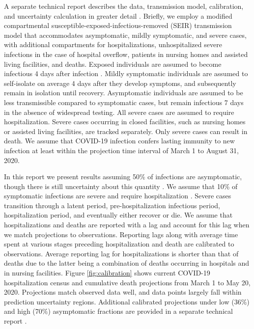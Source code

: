 \documentclass[11pt]{article}
\begin{document}
A separate technical report describes the data, transmission model, calibration, and uncertainty calculation in greater detail \citep{morozova2020tech}.  Briefly, we employ a modified compartmental susceptible-exposed-infectious-removed (SEIR) transmission model that accommodates asymptomatic, mildly symptomatic, and severe cases, with additional compartments for hospitalizations, unhospitalized severe infections in the case of hospital overflow, patients in nursing homes and assisted living facilities, and deaths. Exposed individuals are assumed to become infectious 4 days after infection \citep{lauer2020incubation, bi2020epidemiology, li2020early, linton2020incubation, he2020estimation, salje2020estimating, wei2020presymptomatic}.  Mildly symptomatic individuals are assumed to self-isolate on average 4 days after they develop symptoms, and subsequently remain in isolation until recovery. Asymptomatic individuals are assumed to be less transmissible compared to symptomatic cases, but remain infectious 7 days in the absence of widespread testing. All severe cases are assumed to require hospitalization. Severe cases occurring in closed facilities, such as nursing homes or assisted living facilities, are tracked separately. Only severe cases can result in death. We assume that COVID-19 infection confers lasting immunity to new infection at least within the projection time interval of March 1 to August 31, 2020.  

In this report we present results assuming 50\% of infections are asymptomatic, though there is still uncertainty about this quantity \citep{he2020estimation, nishiura2020estimation, mizumoto2020estimating, emery2020contribution}.  We assume that 10\% of symptomatic infections are severe and require hospitalization \citep{verity2020estimates, bi2020epidemiology, salje2020estimating}.  Severe cases transition through a latent period, pre-hospitalization infectious period, hospitalization period, and eventually either recover or die. We assume that hospitalizations and deaths are reported with a lag and account for this lag when we match projections to observations. Reporting lags along with average time spent at various stages preceding hospitalization and death are calibrated to observations. Average reporting lag for hospitalizations is shorter than that of deaths due to the latter being a combination of deaths occurring in hospitals and in nursing facilities.  Figure \ref{fig:calibration} shows current COVID-19 hospitalization census and cumulative death projections from March 1 to May 20, 2020.  Projections match observed data well, and data points largely fall within prediction uncertainty regions.  Additional calibrated projections under low (36\%) and high (70\%) asymptomatic fractions are provided in a separate technical report \citep{morozova2020tech}.  
\end{document}
